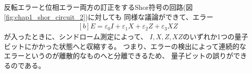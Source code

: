 \documentclass[../master.tex]{subfiles}
\begin{document}
反転エラーと位相エラー両方の訂正をするShor符号の回路(図\ref{fig:chap1_shor_circuit_2})に対しても
同様な議論ができて、エラー
\begin{equation}\begin{aligned}[b]
    E = \varepsilon_0 I + \varepsilon_1 X + \varepsilon_2 Z + \varepsilon_3 XZ
\end{aligned}\end{equation}
が入ったときに、シンドローム測定によって、
\(I, X, Z, XZ\)のいずれか1つの量子ビットにかかった状態へと収縮する。
つまり、エラーの検出によって連続的なエラーというのが離散的なものへと分離できるため、
量子ビットの誤りができるのである。
\end{document}
